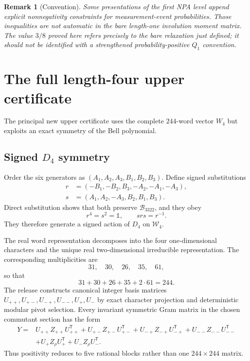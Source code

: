 \documentclass[11pt]{article}
\newtheorem{remark}[theorem]{Remark}
\newcommand{\1}{\mathbb{1}}
\newcommand{\Bop}{\mathcal{B}_{3322}}
\newcommand{\W}{\mathcal{W}}
\begin{document}
\begin{remark}[Convention]\label{rem:level1}
Some presentations of the first NPA level append explicit nonnegativity constraints for measurement-event probabilities.  Those inequalities are not automatic in the bare length-one involution moment matrix.  The value $3/8$ proved here refers precisely to the bare relaxation just defined; it should not be identified with a strengthened probability-positive $Q_1$ convention.
\end{remark}

\section{The full length-four upper certificate}\label{sec:upper4}
The principal new upper certificate uses the complete $244$-word vector $W_4$ but exploits an exact symmetry of the Bell polynomial.

\subsection{Signed \texorpdfstring{$D_4$}{D4} symmetry}
Order the six generators as $(A_1,A_2,A_3,B_1,B_2,B_3)$.  Define signed substitutions
\begin{align*}
r&=(-B_1,-B_2,B_3,-A_2,-A_1,-A_3),\\
s&=(A_1,A_2,-A_3,B_2,B_1,B_3).
\end{align*}
Direct substitution shows that both preserve $\Bop$, and they obey
\[
r^4=s^2=\1,\qquad srs=r^{-1}.
\]
They therefore generate a signed action of $D_4$ on $\W_4$.

The real word representation decomposes into the four one-dimensional characters and the unique real two-dimensional irreducible representation.  The corresponding multiplicities are
\[
31,\quad30,\quad26,\quad35,\quad61,
\]
so that
\[
31+30+26+35+2\cdot61=244.
\]
The release constructs canonical integer basis matrices $U_{++},U_{+-},U_{-+},U_{--},U_+,U_-$ by exact character projection and deterministic modular pivot selection.  Every invariant symmetric Gram matrix in the chosen commutant section has the form
\begin{align}\label{eq:blockreconstruction}
Y={}&U_{++}Z_{++}U_{++}^{\mathsf T}+U_{+-}Z_{+-}U_{+-}^{\mathsf T}
+U_{-+}Z_{-+}U_{-+}^{\mathsf T}+U_{--}Z_{--}U_{--}^{\mathsf T}\nonumber\\
&+U_+Z_\rho U_+^{\mathsf T}+U_-Z_\rho U_-^{\mathsf T}.
\end{align}
Thus positivity reduces to five rational blocks rather than one $244\times244$ matrix.
\end{document}
